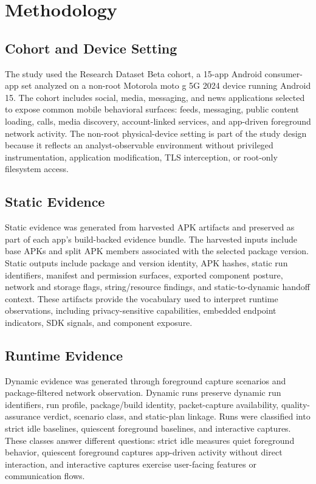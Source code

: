\section{Methodology}

\subsection{Cohort and Device Setting}

The study used the Research Dataset Beta cohort, a 15-app Android consumer-app set analyzed on a non-root Motorola moto g 5G 2024 device running Android 15. The cohort includes social, media, messaging, and news applications selected to expose common mobile behavioral surfaces: feeds, messaging, public content loading, calls, media discovery, account-linked services, and app-driven foreground network activity. The non-root physical-device setting is part of the study design because it reflects an analyst-observable environment without privileged instrumentation, application modification, TLS interception, or root-only filesystem access.

\subsection{Static Evidence}

Static evidence was generated from harvested APK artifacts and preserved as part of each app's build-backed evidence bundle. The harvested inputs include base APKs and split APK members associated with the selected package version. Static outputs include package and version identity, APK hashes, static run identifiers, manifest and permission surfaces, exported component posture, network and storage flags, string/resource findings, and static-to-dynamic handoff context. These artifacts provide the vocabulary used to interpret runtime observations, including privacy-sensitive capabilities, embedded endpoint indicators, SDK signals, and component exposure.

\subsection{Runtime Evidence}

Dynamic evidence was generated through foreground capture scenarios and package-filtered network observation. Dynamic runs preserve dynamic run identifiers, run profile, package/build identity, packet-capture availability, quality-assurance verdict, scenario class, and static-plan linkage. Runs were classified into strict idle baselines, quiescent foreground baselines, and interactive captures. These classes answer different questions: strict idle measures quiet foreground behavior, quiescent foreground captures app-driven activity without direct interaction, and interactive captures exercise user-facing features or communication flows.

